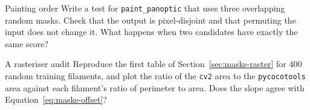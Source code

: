 \begin{exercise}{Painting order}
Write a test for \texttt{paint\_panoptic} that uses three overlapping random masks. Check that the
output is pixel-disjoint and that permuting the input does not change it. What happens when two
candidates have exactly the same score?
\end{exercise}

\begin{exercise}{A rasteriser audit}
Reproduce the first table of Section~\ref{sec:masks-raster} for 400 random training filaments, and
plot the ratio of the \texttt{cv2} area to the \texttt{pycocotools} area against each filament's
ratio of perimeter to area. Does the slope agree with Equation~\eqref{eq:masks-offset}?
\end{exercise}
